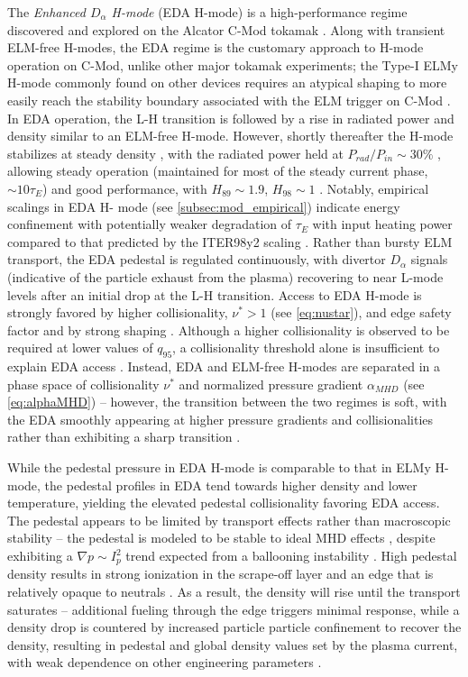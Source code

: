 The \emph{Enhanced $D_\alpha$ H-mode} (EDA H-mode) is a high-performance regime discovered and explored on the Alcator C-Mod tokamak \cite{Greenwald1999,Hubbard2001,Hughes2005}.  Along with transient ELM-free H-modes, the EDA regime is the customary approach to H-mode operation on C-Mod, unlike other major tokamak experiments; the Type-I ELMy H-mode commonly found on other devices requires an atypical shaping to more easily reach the stability boundary associated with the ELM trigger on C-Mod \cite{Hughes2013}.  In EDA operation, the L-H transition is followed by a rise in radiated power and density similar to an ELM-free H-mode.  However, shortly thereafter the H-mode stabilizes at steady density \cite{Greenwald1999}, with the radiated power held at $P_{rad}/P_{in} \sim 30\%$ \cite{Hubbard1998}, allowing steady operation (maintained for most of the steady current phase, $\sim 10\tau_E$) and good performance, with $H_{89} \sim 1.9$, $H_{98} \sim 1$ \cite{Hubbard2001}.  Notably, empirical scalings in EDA H-
mode (see \cref{subsec:mod_empirical}) indicate energy confinement with potentially weaker degradation of $\tau_E$ with input heating power compared to that predicted by the ITER98y2 scaling \cite{Hughes2002,Hughes2005,Hughes2006}.  Rather than bursty ELM transport, the EDA pedestal is regulated continuously, with divertor $D_\alpha$ signals (indicative of the particle exhaust from the plasma) recovering to near L-mode levels after an initial drop at the L-H transition.  Access to EDA H-mode is strongly favored by higher collisionality, $\nu^* > 1$ (see \cref{eq:nustar}), and edge safety factor \cite{Hughes2002,Mossessian2002} and by strong shaping \cite{Mossessian2002}.  Although a higher collisionality is observed to be required at lower values of $q_{95}$, a collisionality threshold alone is insufficient to explain EDA access \cite{Hughes2002}.  Instead, EDA and ELM-free H-modes are separated in a phase space of collisionality $\nu^*$ and normalized pressure gradient $\alpha_{MHD}$ (see \cref{eq:alphaMHD})
 -- however, the transition between the two regimes is soft, with the EDA smoothly appearing at higher pressure gradients and collisionalities rather than exhibiting a sharp transition \cite{Hughes2007a}.

While the pedestal pressure in EDA H-mode is comparable to that in ELMy H-mode, the pedestal profiles in EDA tend towards higher density and lower temperature, yielding the elevated pedestal collisionality favoring EDA access.  The pedestal appears to be limited by transport effects rather than macroscopic stability -- the pedestal is modeled to be stable to ideal MHD effects \cite{Mossessian2002,Hughes2013}, despite exhibiting a $\nabla p \sim I_p^2$ trend expected from a ballooning instability \cite{Hughes2006}.  High pedestal density results in strong ionization in the scrape-off layer and an edge that is relatively opaque to neutrals \cite{Hubbard2007,Greenwald2007}.  As a result, the density will rise until the transport saturates -- additional fueling through the edge triggers minimal response, while a density drop is countered by increased particle particle confinement to recover the density, resulting in pedestal and global density values set by the plasma current, with weak dependence on other 
engineering parameters \cite{Hughes2007}.

